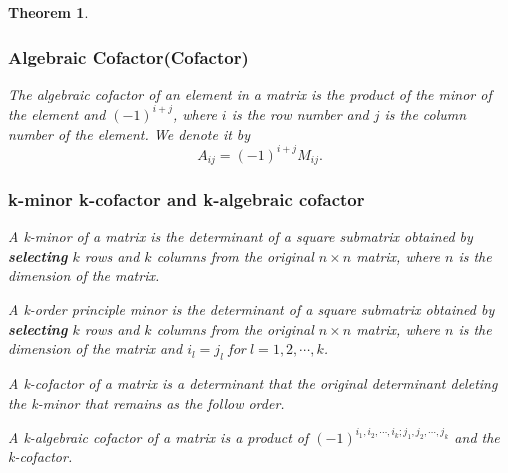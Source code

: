 \documentclass{article}
\newtheorem{theorem}{Theorem}[section]
\theoremstyle{definition}
\begin{document}
\begin{theorem}
\subsubsection{Algebraic Cofactor(Cofactor)}

The algebraic cofactor of an element in a matrix is the product of the minor of the element and 
$(-1)^{i+j}$, where $i$ is the row number and $j$ is the column number of the element. 
We denote it by 
$$A_{ij}=(-1)^{i+j}M_{ij}.$$
\subsubsection{k-minor  k-cofactor and k-algebraic cofactor}

A k-minor of a matrix is the determinant of a 
square submatrix obtained by \textbf{selecting} $k$ 
rows and $k$ columns from the original $n×n$ 
matrix, where $n$ is the dimension of the matrix.

A k-order principle minor is the determinant of a 
square submatrix obtained by \textbf{selecting} $k$
rows and $k$ columns from the original $n×n$
matrix, where $n$ is the dimension of the matrix and 
$i_{l}=j_{l}\ for\ l=1,2,\cdots,k$. 



A k-cofactor of a matrix is a determinant that the original determinant deleting the 
k-minor that remains as the follow order.

A k-algebraic cofactor of a matrix is a product of $(-1)^{i_{1},i_{2},\cdots,i_{k};j_{1},j_{2},\cdots,j_{k}}$
 and the k-cofactor.

\end{theorem}
\end{document}
